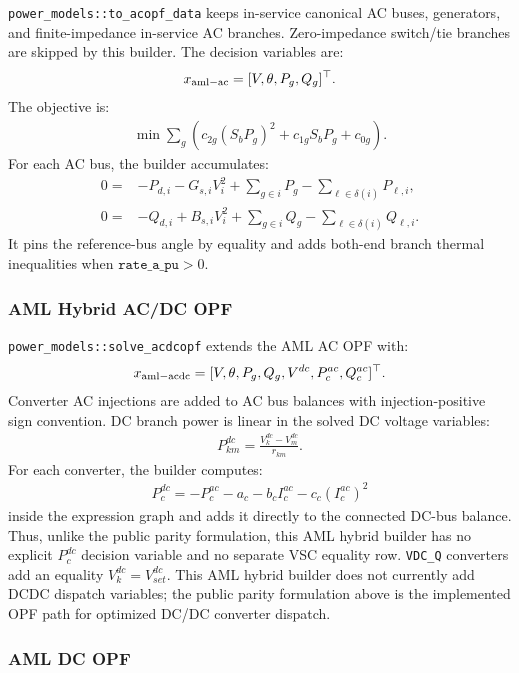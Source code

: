 \texttt{power\_models::to\_acopf\_data} keeps in-service canonical AC buses,
generators, and finite-impedance in-service AC branches.  Zero-impedance
switch/tie branches are skipped by this builder.  The decision variables are:
\begin{align}
x_{\mathrm{aml-ac}}=[V,\theta,P_g,Q_g]^{\top}.
\end{align}
The objective is:
\begin{align}
\min\sum_g
\left(c_{2g}(S_bP_g)^2+c_{1g}S_bP_g+c_{0g}\right).
\end{align}
For each AC bus, the builder accumulates:
\begin{align}
0=&
-P_{d,i}-G_{s,i}V_i^2+\sum_{g\in i}P_g
-\sum_{\ell\in\delta(i)}P_{\ell,i},\\
0=&
-Q_{d,i}+B_{s,i}V_i^2+\sum_{g\in i}Q_g
-\sum_{\ell\in\delta(i)}Q_{\ell,i}.
\end{align}
It pins the reference-bus angle by equality and adds both-end branch thermal
inequalities when \(\texttt{rate\_a\_pu}>0\).

\subsubsection{AML Hybrid AC/DC OPF}

\texttt{power\_models::solve\_acdcopf} extends the AML AC OPF with:
\begin{align}
x_{\mathrm{aml-acdc}}=
[V,\theta,P_g,Q_g,V^{dc},P_c^{ac},Q_c^{ac}]^{\top}.
\end{align}
Converter AC injections are added to AC bus balances with injection-positive
sign convention.  DC branch power is linear in the solved DC voltage variables:
\begin{align}
P_{km}^{dc}=\frac{V_k^{dc}-V_m^{dc}}{r_{km}}.
\end{align}
For each converter, the builder computes:
\begin{align}
P_c^{dc}=-P_c^{ac}-a_c-b_cI_c^{ac}-c_c(I_c^{ac})^2
\end{align}
inside the expression graph and adds it directly to the connected DC-bus
balance.  Thus, unlike the public parity formulation, this AML hybrid builder
has no explicit \(P_c^{dc}\) decision variable and no separate VSC equality row.
\texttt{VDC\_Q} converters add an equality \(V_k^{dc}=V_{set}^{dc}\).
This AML hybrid builder does not currently add DCDC dispatch variables; the
public parity formulation above is the implemented OPF path for optimized
DC/DC converter dispatch.

\subsubsection{AML DC OPF}

